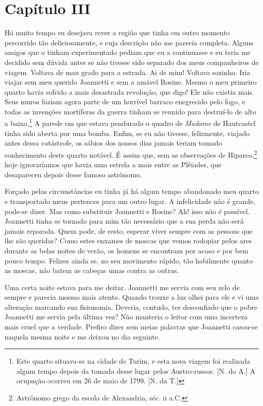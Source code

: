 \section*{Capítulo III}

 Há muito tempo eu desejava rever a região que tinha em outro momento
percorrido tão deliciosamente, e cuja descrição não me parecia
completa. Alguns amigos que o tinham experimentado pediam que eu a
continuasse e eu teria me decidido sem dúvida antes se não tivesse sido
separado dos meus companheiros de viagem. Voltava de mau grado para a
estrada. Ai de mim! Voltava sozinho. Iria viajar sem meu querido
Joannetti e sem a amável Rosine. Mesmo o meu primeiro quarto havia
sofrido a mais desastrada revolução, que digo! Ele não existia mais.
Seus muros faziam agora parte de um horrível barraco enegrecido pelo
fogo, e todas as invenções mortíferas da guerra tinham se reunido para
destruí-lo de alto a baixo.\footnote{ Este quarto situava-se na cidade
de Turim, e esta nova viagem foi realizada algum tempo depois da tomada
desse lugar pelos Austro-russos. [N. do A.]  A ocupação ocorreu em 26 de maio
de 1799. [N. da T.]} A parede em que estava pendurado o quadro de \textit{Madame} de
Hautcastel tinha sido aberta por uma bomba. Enfim, se eu não tivesse,
felizmente, viajado antes dessa catástrofe, os sábios dos nossos dias
jamais teriam tomado conhecimento deste quarto notável. É assim que,
sem as observações de Hiparco,\footnote{ Astrônomo grego da escola de
Alexandria, séc. \textsc{ii} a.C.} hoje ignoraríamos que havia uma estrela a
mais entre as Plêiades, que desapareceu depois desse famoso astrônomo. 

 Forçado pelas circunstâncias eu tinha já há algum tempo abandonado meu
quarto e transportado meus pertences para um outro lugar. A
infelicidade não é grande, pode-se dizer. Mas como substituir Joannetti
e Rosine? Ah! isso não é possível. Joannetti tinha se tornado para mim tão
necessário que a sua perda não será jamais reparada. Quem
pode, de resto, esperar viver sempre com as pessoas que lhe são
queridas? Como estes enxames de moscas que vemos rodopiar pelos ares
durante as belas noites de verão, os homens se encontram por acaso e
por bem pouco tempo. Felizes ainda se, no seu movimento rápido, tão
habilmente quanto as moscas, não batem as cabeças umas contra as outras.


 Uma certa noite estava para me deitar. Joannetti me servia com seu zelo
de sempre e parecia mesmo mais atento. Quando trouxe a luz olhei para
ele e vi uma alteração marcando sua fisionomia. Deveria, contudo, ter
desconfiado que o pobre Joannetti me servia pela última vez? Não
manteria o leitor com uma incerteza mais cruel que a verdade. Prefiro
dizer sem meias palavras que Joannetti casou-se naquela mesma noite e
me deixou no dia seguinte.

